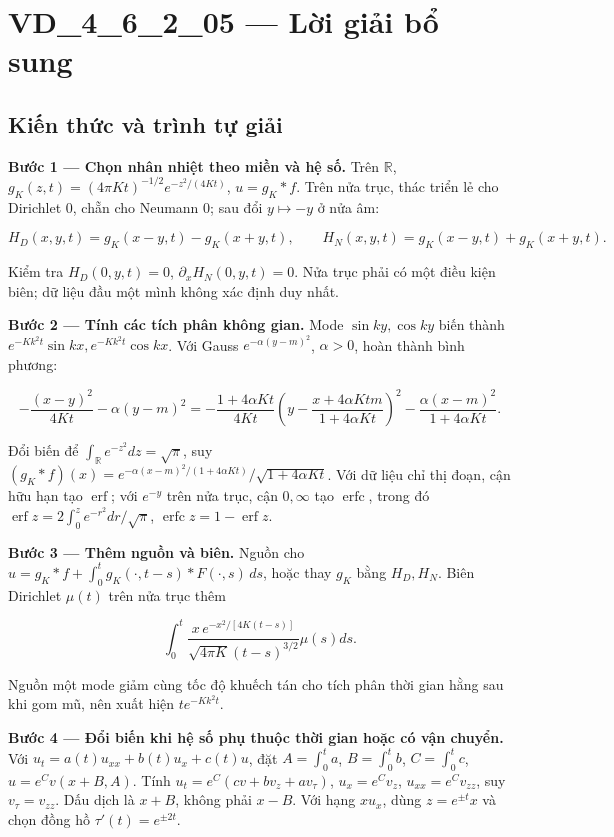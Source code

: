 \documentclass[10pt,a4paper]{article}
\begin{document}
\section*{VD\_4\_6\_2\_05 — Lời giải bổ sung}
\subsection*{Kiến thức và trình tự giải}
\textbf{Bước 1 — Chọn nhân nhiệt theo miền và hệ số.} Trên $\mathbb R$, $g_K(z,t)=(4\pi Kt)^{-1/2}e^{-z^2/(4Kt)}$, $u=g_K*f$. Trên nửa trục, thác triển lẻ cho Dirichlet $0$, chẵn cho Neumann $0$; sau đổi $y\mapsto-y$ ở nửa âm:


\[
H_D(x,y,t)=g_K(x-y,t)-g_K(x+y,t),\qquad
H_N(x,y,t)=g_K(x-y,t)+g_K(x+y,t).
\]


Kiểm tra $H_D(0,y,t)=0$, $\partial_xH_N(0,y,t)=0$. Nửa trục phải có một điều kiện biên; dữ liệu đầu một mình không xác định duy nhất.

\textbf{Bước 2 — Tính các tích phân không gian.} Mode $\sin ky,\cos ky$ biến thành $e^{-Kk^2t}\sin kx,e^{-Kk^2t}\cos kx$. Với Gauss $e^{-\alpha(y-m)^2}$, $\alpha>0$, hoàn thành bình phương:


\[
-\frac{(x-y)^2}{4Kt}-\alpha(y-m)^2
=-\frac{1+4\alpha Kt}{4Kt}\left(y-\frac{x+4\alpha Ktm}{1+4\alpha Kt}\right)^2
-\frac{\alpha(x-m)^2}{1+4\alpha Kt}.
\]


Đổi biến để $\int_{\mathbb R}e^{-z^2}dz=\sqrt\pi$, suy $(g_K*f)(x)=e^{-\alpha(x-m)^2/(1+4\alpha Kt)}/\sqrt{1+4\alpha Kt}$. Với dữ liệu chỉ thị đoạn, cận hữu hạn tạo $\operatorname{erf}$; với $e^{-y}$ trên nửa trục, cận $0,\infty$ tạo $\operatorname{erfc}$, trong đó $\operatorname{erf}z=2\int_0^ze^{-r^2}dr/\sqrt\pi$, $\operatorname{erfc}z=1-\operatorname{erf}z$.

\textbf{Bước 3 — Thêm nguồn và biên.} Nguồn cho $u=g_K*f+\int_0^tg_K(\cdot,t-s)*F(\cdot,s)\,ds$, hoặc thay $g_K$ bằng $H_D,H_N$. Biên Dirichlet $\mu(t)$ trên nửa trục thêm


\[
\int_0^t\frac{x\,e^{-x^2/[4K(t-s)]}}{\sqrt{4\pi K}(t-s)^{3/2}}\mu(s)ds.
\]


Nguồn một mode giảm cùng tốc độ khuếch tán cho tích phân thời gian hằng sau khi gom mũ, nên xuất hiện $te^{-Kk^2t}$.

\textbf{Bước 4 — Đổi biến khi hệ số phụ thuộc thời gian hoặc có vận chuyển.} Với $u_t=a(t)u_{xx}+b(t)u_x+c(t)u$, đặt $A=\int_0^ta$, $B=\int_0^tb$, $C=\int_0^tc$, $u=e^Cv(x+B,A)$. Tính $u_t=e^C(cv+bv_z+av_\tau)$, $u_x=e^Cv_z$, $u_{xx}=e^Cv_{zz}$, suy $v_\tau=v_{zz}$. Dấu dịch là $x+B$, không phải $x-B$. Với hạng $xu_x$, dùng $z=e^{\pm t}x$ và chọn đồng hồ $\tau'(t)=e^{\pm2t}$.
\end{document}
